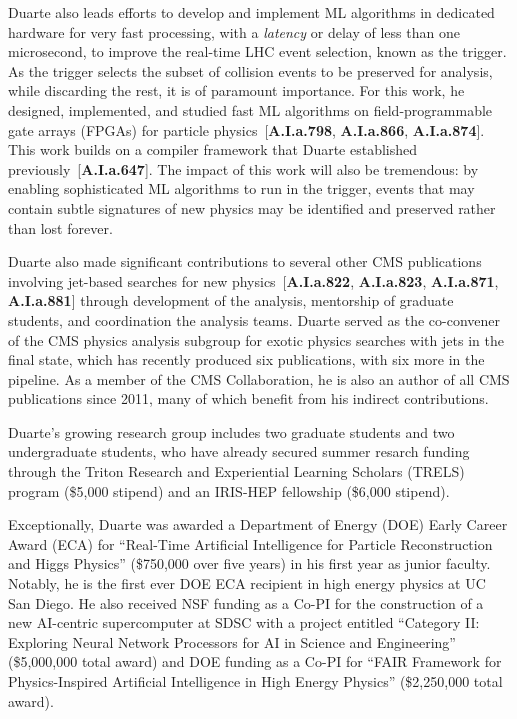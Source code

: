 \documentclass[11pt]{article}
\begin{document}
Duarte also leads efforts to develop and implement ML algorithms in dedicated hardware for very fast processing, with a \emph{latency} or delay of less than one microsecond, to improve the real-time LHC event selection, known as the trigger.
As the trigger selects the subset of collision events to be preserved for analysis, while discarding the rest, it is of paramount importance.
For this work, he designed, implemented, and studied fast ML algorithms on field-programmable gate arrays (FPGAs) for particle physics~[\textbf{A.I.a.798}, \textbf{A.I.a.866}, \textbf{A.I.a.874}].
This work builds on a compiler framework that Duarte established previously~[\textbf{A.I.a.647}].
The impact of this work will also be tremendous: by enabling sophisticated ML algorithms to run in the trigger, events that may contain subtle signatures of new physics may be identified and preserved rather than lost forever.

Duarte also made significant contributions to several other CMS publications involving jet-based searches for new physics~[\textbf{A.I.a.822}, \textbf{A.I.a.823}, \textbf{A.I.a.871}, \textbf{A.I.a.881}] through development of the analysis, mentorship of graduate students, and coordination the analysis teams.
Duarte served as the co-convener of the CMS physics analysis subgroup for exotic physics searches with jets in the final state, which has recently produced six publications, with six more in the pipeline.
As a member of the CMS Collaboration, he is also an author of all CMS publications since 2011, many of which benefit from his indirect contributions.

Duarte's growing research group includes two graduate students and two undergraduate students, who have already secured summer resarch funding through the Triton Research and Experiential Learning Scholars (TRELS) program (\$5,000 stipend) and an IRIS-HEP fellowship (\$6,000 stipend).

Exceptionally, Duarte was awarded a Department of Energy (DOE) Early Career Award (ECA) for ``Real-Time Artificial Intelligence for Particle Reconstruction and Higgs Physics'' (\$750,000 over five years) in his first year as junior faculty.
Notably, he is the first ever DOE ECA recipient in high energy physics at UC San Diego.
He also received NSF funding as a Co-PI for the construction of a new AI-centric supercomputer at SDSC with a project entitled ``Category II: Exploring Neural Network Processors for AI in Science and Engineering'' (\$5,000,000 total award) and DOE funding as a Co-PI for ``FAIR Framework for Physics-Inspired Artificial Intelligence in High Energy Physics'' (\$2,250,000 total award).
\end{document}

